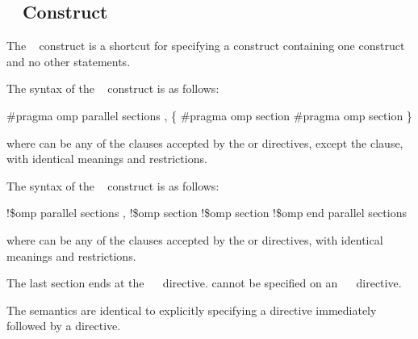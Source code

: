 \pagebreak

\subsection{~ Construct}
\label{subsec:parallel sections Construct}
\summary
The ~ construct is a shortcut for specifying a  
construct containing one  construct and no other statements.

\syntax
\ccppspecificstart
The syntax of the ~ construct is as follows:

\begin{boxedcode}
\#pragma omp parallel sections \plc{[clause[ [},\plc{] clause] ... ] new-line}
    \{
    \plc{[}\#pragma omp section \plc{new-line]}
    \plc{[}\#pragma omp section 
        \plc{structured-block]}
    \}
\end{boxedcode}

where  can be any of the clauses accepted by the  or  
directives, except the  clause, with identical meanings and restrictions.
\ccppspecificend

\fortranspecificstart
The syntax of the ~ construct is as follows:

\begin{boxedcode}
!\$omp parallel sections \plc{[clause[ [},\plc{] clause] ... ]}
    \plc{[}!\$omp section\plc{]}
    \plc{[}!\$omp section 
        \plc{structured-block]}
!\$omp end parallel sections
\end{boxedcode}

where  can be any of the clauses accepted by the  or  
directives, with identical meanings and restrictions. 

The last section ends at the ~~ directive.  cannot be 
specified on an ~~ directive.
\fortranspecificend

\descr
\ccppspecificstart
The semantics are identical to explicitly specifying a  directive immediately 
followed by a  directive.
\ccppspecificend

